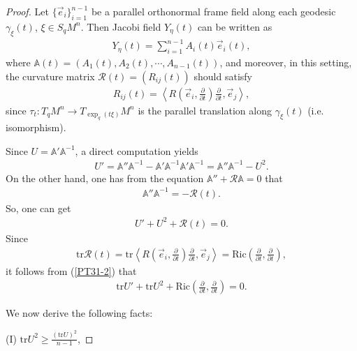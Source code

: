 \documentclass[12pt]{article}
\begin{document}
\begin{proof}
Let $\{\vec{e}_{i}\}_{i=1}^{n-1}$ be a parallel orthonormal frame
field along each geodesic $\gamma_{\xi}(t)$, $\xi\in S_{q}M^{n}$.
Then Jacobi field $Y_{\eta}(t)$ can be written as
\begin{eqnarray*}
Y_{\eta}(t) = \sum\limits_{i=1}^{n-1} A_i(t)\vec{e}_{i}(t),
\end{eqnarray*}
where $\mathbb{A}(t)=(A_{1}(t),A_{2}(t),\cdots,A_{n-1}(t))$, and
moreover, in this setting, the curvature matrix
$\mathcal{R}(t)=(R_{ij}(t))$ should satisfy
\begin{eqnarray*}
R_{ij}(t)=\left\langle R\left(\vec{e}_{i},\frac{\partial}{\partial
t}\right)\frac{\partial}{\partial t}, \vec{e}_{j} \right\rangle,
\end{eqnarray*}
since $\tau_{t}:T_{q}M^{n}\rightarrow{T_{\exp_{q}(t\xi)}M^{n}}$ is
the parallel translation along $\gamma_{\xi}(t)$ (i.e. isomorphism).

Since $U = \mathbb{A}' \mathbb{A}^{-1}$, a direct computation yields
\begin{eqnarray*}
U' =\mathbb{A}'' \mathbb{A}^{-1} - \mathbb{A}' \mathbb{A}^{-1}
\mathbb{A}' \mathbb{A}^{-1} = \mathbb{A}'' \mathbb{A}^{-1} - U^2.
\end{eqnarray*}
On the other hand, one has from the equation
$\mathbb{A}''+\mathcal{R}\mathbb{A}=0$ that
\begin{eqnarray*}
\mathbb{A}''\mathbb{A}^{-1} = -\mathcal{R}(t).
\end{eqnarray*}
So, one can get
\begin{eqnarray}  \label{PT31-2}
U' + U^2 + \mathcal{R}(t) = 0.
\end{eqnarray}
Since
 \begin{eqnarray*}
\mathrm{tr}\mathcal{R}(t)=\mathrm{tr}\left\langle
R\left(\vec{e}_{i},\frac{\partial}{\partial
t}\right)\frac{\partial}{\partial t}, \vec{e}_{j}
\right\rangle=\mathrm{Ric}\left(\frac{\partial}{\partial
t},\frac{\partial}{\partial t}\right),
 \end{eqnarray*}
it follows from (\ref{PT31-2}) that
 \begin{eqnarray} \label{PT31-3}
\mathrm{tr}U'+\mathrm{tr}U^{2}+\mathrm{Ric}\left(\frac{\partial}{\partial
t}, \frac{\partial}{\partial t}\right)=0.
 \end{eqnarray}

We now derive the following facts:

\vspace{2mm}

\noindent (I) $\mathrm{tr} U^{2}\geq\frac{(\mathrm{tr}
U)^{2}}{n-1}$,


\end{proof}
\end{document}
